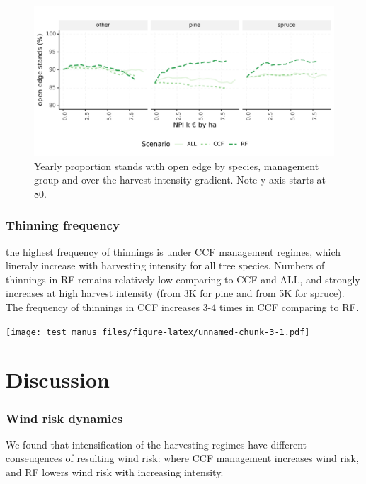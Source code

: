\documentclass[]{elsarticle} %
\makeatletter
\def\maxwidth{\ifdim\Gin@nat@width>\linewidth\linewidth
\else\Gin@nat@width\fi}
\let\Oldincludegraphics\includegraphics
\renewcommand{\includegraphics}[1]{\Oldincludegraphics[width=\maxwidth]{#1}}
\makeatother
\begin{document}
\begin{figure}
\centering
\includegraphics{test_manus_files/figure-latex/fig_6_count_open_edge-1.pdf}
\caption{Yearly proportion stands with open edge by species, management
group and over the harvest intensity gradient. Note y axis starts at
80.}
\end{figure}

\hypertarget{thinning-frequency}{%
\subsubsection{Thinning frequency}\label{thinning-frequency}}

the highest frequency of thinnings is under CCF management regimes,
which lineraly increase with harvesting intensity for all tree species.
Numbers of thinnings in RF remains relatively low comparing to CCF and
ALL, and strongly increases at high harvest intensity (from 3K for pine
and from 5K for spruce). The frequency of thinnings in CCF increases 3-4
times in CCF comparing to RF.

\texttt{[image: test\_manus\_files/figure-latex/unnamed-chunk-3-1.pdf]}

\hypertarget{discussion}{%
\section{Discussion}\label{discussion}}

\hypertarget{wind-risk-dynamics}{%
\subsubsection{Wind risk dynamics}\label{wind-risk-dynamics}}

We found that intensification of the harvesting regimes have different
conseuqences of resulting wind risk: where CCF management increases wind
risk, and RF lowers wind risk with increasing intensity.
\end{document}
